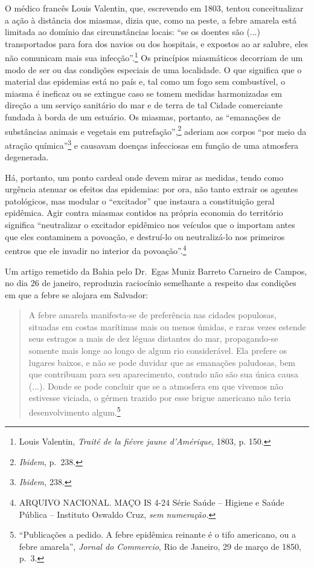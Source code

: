 O médico francês Louis Valentin, que, escrevendo em 1803, tentou
conceitualizar a ação à distância dos miasmas, dizia que, como na peste,
a febre amarela está limitada ao domínio das circunstâncias locais: ``se
os doentes são (...) transportados para fora dos navios ou dos
hospitais, e expostos ao ar salubre, eles não comunicam mais sua
infecção''.\footnote{Louis Valentin, \emph{Traité de la fiévre jaune
  d'Amérique}, 1803, p. 150.} Os princípios miasmáticos decorriam de um
modo de ser ou das condições especiais de uma localidade. O que
significa que o material das epidemias está no país e, tal como um fogo
sem combustível, o miasma é ineficaz ou se extingue caso se tomem
medidas harmonizadas em direção a um serviço sanitário do mar e de terra
de tal Cidade comerciante fundada à borda de um estuário. Os miasmas,
portanto, as ``emanações de substâncias animais e vegetais em
putrefação'',\footnote{\emph{Ibidem}, p.~238.} aderiam aos corpos ``por
meio da atração química''\footnote{\emph{Ibidem,} 238.} e causavam
doenças infecciosas em função de uma atmosfera degenerada.

Há, portanto, um ponto cardeal onde devem mirar as medidas, tendo como
urgência atenuar os efeitos das epidemias: por ora, não tanto extrair os
agentes patológicos, mas modular o ``excitador'' que instaura a
constituição geral epidêmica. Agir contra miasmas contidos na própria
economia do território significa ``neutralizar o excitador epidêmico nos
veículos que o importam antes que eles contaminem a povoação, e
destruí-lo ou neutralizá-lo nos primeiros centros que ele invadir no
interior da povoação''.\footnote{ARQUIVO NACIONAL. MAÇO IS 4-24 Série
  Saúde -- Higiene e Saúde Pública -- Instituto Oswaldo Cruz, \emph{sem
  numeração.}}

Um artigo remetido da Bahia pelo Dr.~Egas Muniz Barreto Carneiro de
Campos, no dia 26 de janeiro, reproduzia raciocínio semelhante a
respeito das condições em que a febre se alojara em Salvador:

\begin{quote}
A febre amarela manifesta-se de preferência nas cidades populosas,
situadas em costas marítimas mais ou menos úmidas, e raras vezes estende
seus estragos a mais de dez léguas distantes do mar, propagando-se
somente mais longe ao longo de algum rio considerável. Ela prefere os
lugares baixos, e não se pode duvidar que as emanações paludosas, bem
que contribuam para seu aparecimento, contudo não são sua única causa
(...). Donde se pode concluir que se a atmosfera em que vivemos não
estivesse viciada, o gérmen trazido por esse brigue americano não teria
desenvolvimento algum.\footnote{``Publicações a pedido. A febre
  epidêmica reinante é o tifo americano, ou a febre amarela'',
  \emph{Jornal do Commercio}, Rio de Janeiro, 29 de março de 1850, p.~3.}
\end{quote}

